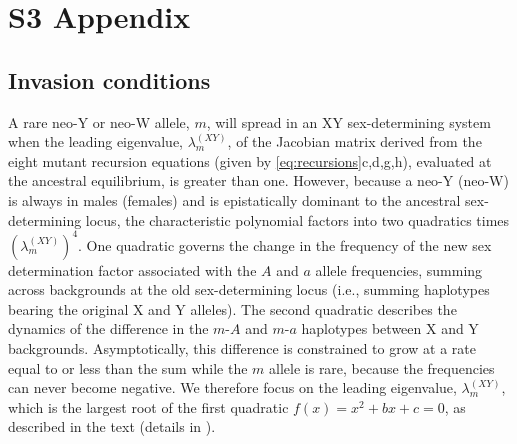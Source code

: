 \documentclass[10pt,letterpaper]{article}
\date{}
\begin{document}
\vspace*{0.2in}

\setcounter{equation}{0}
\renewcommand{\theequation}{S3.\arabic{equation}}

\section*{S3 Appendix}

\subsection*{Invasion conditions}

A rare neo-Y or neo-W allele, $m$, will spread in an XY sex-determining system when the leading eigenvalue, $\lambda_m^{(XY)}$, of the Jacobian matrix derived from the eight mutant recursion equations (given by \ref{eq:recursions}c,d,g,h), evaluated at the ancestral equilibrium, is greater than one.
However, because a neo-Y (neo-W) is always in males (females) and is epistatically dominant to the ancestral sex-determining locus, the characteristic polynomial factors into two quadratics times $(\lambda_m^{(XY)})^4$.  
One quadratic governs the change in the frequency of the new sex determination factor associated with the $A$ and $a$ allele frequencies, summing across backgrounds at the old sex-determining locus (i.e., summing haplotypes bearing the original X and Y alleles). 
The second quadratic describes the dynamics of the difference in the $m$-$A$ and $m$-$a$ haplotypes between X and Y backgrounds.  
Asymptotically, this difference is constrained to grow at a rate equal to or less than the sum while the $m$ allele is rare, because the frequencies can never become negative. 
We therefore focus on the leading eigenvalue, $\lambda_m^{(XY)}$, which is the largest root of the first quadratic $f(x) = x^2+ b x + c = 0$, as described in the text (details in ).  
\end{document}
